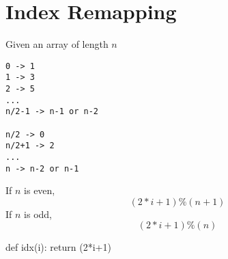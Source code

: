 \section{Index Remapping}
 Given an array of length $n$
\begin{lstlisting}
0 -> 1
1 -> 3
2 -> 5
...
n/2-1 -> n-1 or n-2

n/2 -> 0
n/2+1 -> 2
...
n -> n-2 or n-1
\end{lstlisting}
If $n$ is even, 
$$
(2*i+1)\%(n+1)
$$
If $n$ is odd,
$$
(2*i+1)\%(n)
$$
\begin{python}
def idx(i):
    return (2*i+1) %
\end{python}

